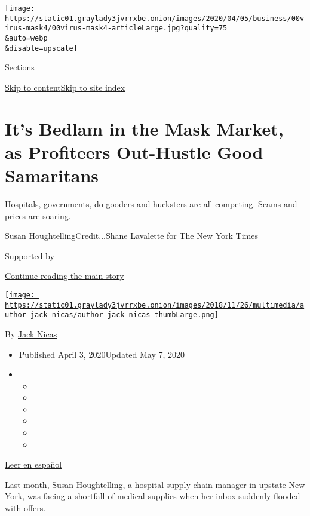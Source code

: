 \texttt{[image: https://static01.graylady3jvrrxbe.onion/images/2020/04/05/business/00virus-mask4/00virus-mask4-articleLarge.jpg?quality=75\\\&auto=webp\\\&disable=upscale]}

Sections

\protect\hyperlink{site-content}{Skip to
content}\protect\hyperlink{site-index}{Skip to site index}

\hypertarget{its-bedlam-in-the-mask-market-as-profiteers-out-hustle-good-samaritans}{%
\section{It's Bedlam in the Mask Market, as Profiteers Out-Hustle Good
Samaritans}\label{its-bedlam-in-the-mask-market-as-profiteers-out-hustle-good-samaritans}}

Hospitals, governments, do-gooders and hucksters are all competing.
Scams and prices are soaring.

Susan HoughtellingCredit...Shane Lavalette for The New York Times

Supported by

\protect\hyperlink{after-sponsor}{Continue reading the main story}

\href{https://www.nytimes3xbfgragh.onion/by/jack-nicas}{\texttt{[image: https://static01.graylady3jvrrxbe.onion/images/2018/11/26/multimedia/author-jack-nicas/author-jack-nicas-thumbLarge.png]}}

By \href{https://www.nytimes3xbfgragh.onion/by/jack-nicas}{Jack Nicas}

\begin{itemize}
\item
  Published April 3, 2020Updated May 7, 2020
\item
  \begin{itemize}
  \item
  \item
  \item
  \item
  \item
  \item
  \end{itemize}
\end{itemize}

\href{https://www.nytimes3xbfgragh.onion/es/2020/04/06/espanol/ciencia-y-tecnologia/precio-mascarillas-n95-coronavirus.html}{Leer
en español}

Last month, Susan Houghtelling, a hospital supply-chain manager in
upstate New York, was facing a shortfall of medical supplies when her
inbox suddenly flooded with offers.

